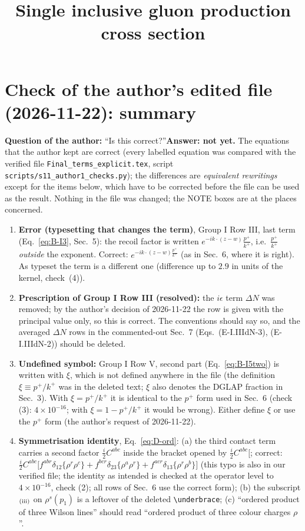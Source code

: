 \documentclass[9pt]{article}
\title{Single inclusive gluon production cross section}
\author{}
\date{}
\numberwithin{equation}{section}
\begin{document}
\maketitle
{\color{red}
\section*{Check of the author's edited file (2026-11-22): summary}
\noindent\textbf{Question of the author:} ``Is this correct?''\quad \textbf{Answer: not yet.} The equations that the author kept are correct (every labelled equation was compared with the verified file \texttt{Final\_terms\_explicit.tex}, script \texttt{scripts/s11\_author1\_checks.py}); the differences are \emph{equivalent rewritings} except for the items below, which have to be corrected before the file can be used as the result. Nothing in the file was changed; the NOTE boxes are at the places concerned.
\begin{enumerate}
\item \textbf{Error (typesetting that changes the term)}, Group I Row III, last term (Eq.~\eqref{eq:B-I3}, Sec.~5): the recoil factor is written $e^{-ik\cdot(z-w)}\frac{p^{+}}{k^{+}}$, i.e.\ $\frac{p^{+}}{k^{+}}$ \emph{outside} the exponent. Correct: $e^{-ik\cdot(z-w)\frac{p^{+}}{k^{+}}}$ (as in Sec.~6, where it is right). As typeset the term is a different one (difference up to $2.9$ in units of the kernel, check~(4)).
\item \textbf{Prescription of Group I Row III (resolved):} the $i\epsilon$ term $\Delta N$ was removed; by the author's decision of 2026-11-22 the row is given with the principal value only, so this is correct. The conventions should say so, and the averaged $\Delta N$ rows in the commented-out Sec.~7 (Eqs.~(E-I.IIIdN-3), (E-I.IIIdN-2)) should be deleted.
\item \textbf{Undefined symbol:} Group I Row V, second part (Eq.~\eqref{eq:B-I5two}) is written with $\xi$, which is not defined anywhere in the file (the definition $\xi\equiv p^{+}/k^{+}$ was in the deleted text; $\xi$ also denotes the DGLAP fraction in Sec.~3). With $\xi=p^{+}/k^{+}$ it is identical to the $p^{+}$ form used in Sec.~6 (check (3): $4\times10^{-16}$; with $\xi=1-p^{+}/k^{+}$ it would be wrong). Either define $\xi$ or use the $p^{+}$ form (the author's request of 2026-11-22).
\item \textbf{Symmetrisation identity}, Eq.~\eqref{eq:D-ord}: (a) the third contact term carries a second factor $\frac{i}{2}C^{abc}$ inside the bracket opened by $\frac{i}{2}C^{abc}\big[$; correct: $\frac{i}{2}C^{abc}\big[f^{abr}\delta_{12}\{\rho^r\rho^c\}+f^{bcr}\delta_{23}\{\rho^a\rho^r\}+f^{acr}\delta_{13}\{\rho^r\rho^b\}\big]$ (this typo is also in our verified file; the identity as intended is checked at the operator level to $4\times10^{-16}$, check (2); all rows of Sec.~6 use the correct form); (b) the subscript ${}_{\rm (iii)}$ on $\rho^{s}(p_1)$ is a leftover of the deleted \texttt{\textbackslash underbrace}; (c) ``ordered product of three Wilson lines'' should read ``ordered product of three colour charges $\rho$''.

\end{enumerate}}
\end{document}
